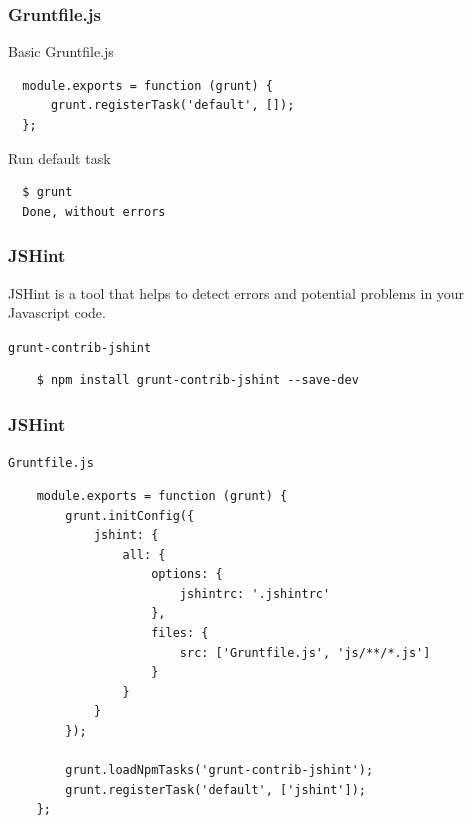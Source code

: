 \begin{frame}[fragile]
  \frametitle{Gruntfile.js}

  \begin{block}{Basic Gruntfile.js}
  {\scriptsize
  \begin{verbatim}
  module.exports = function (grunt) {  
      grunt.registerTask('default', []);
  };
  \end{verbatim}
  }
  \end{block}

  \pause

  \begin{block}{Run default task}
  {\scriptsize
  \begin{verbatim}
  $ grunt
  Done, without errors
  \end{verbatim}
  }
  \end{block}
\end{frame}

\begin{frame}[fragile]
  \frametitle{JSHint}

  JSHint is a tool that helps to detect errors and potential problems in your Javascript code.

  \pause

  \begin{block}{\texttt{grunt-contrib-jshint}}
    {\tiny
    \begin{verbatim}
    $ npm install grunt-contrib-jshint --save-dev
    \end{verbatim}
    }
  \end{block}
\end{frame}

\begin{frame}[fragile]
  \frametitle{JSHint}

  \begin{block}{\texttt{Gruntfile.js}}
    {\tiny
    \begin{verbatim}
    module.exports = function (grunt) {
        grunt.initConfig({
            jshint: {
                all: {
                    options: {
                        jshintrc: '.jshintrc'                                               
                    },
                    files: {
                        src: ['Gruntfile.js', 'js/**/*.js']
                    }
                }
            }
        });

        grunt.loadNpmTasks('grunt-contrib-jshint');
        grunt.registerTask('default', ['jshint']);                                          
    };
    \end{verbatim}
    }
  \end{block}
\end{frame}

